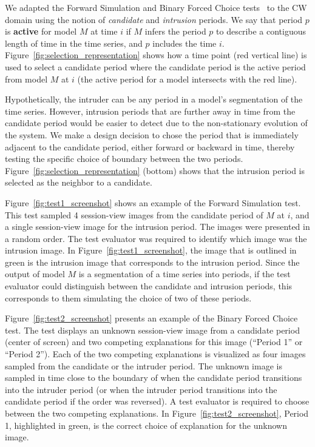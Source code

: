 \documentclass[letterpaper]{article}
\begin{document}
We adapted the Forward Simulation and Binary Forced Choice tests~\cite{doshi2017roadmap} to the CW domain using the notion of \textit{candidate} and \textit{intrusion} periods.
We say that period $p$ is \textbf{active} for model $M$ at time $i$ if  $M$ infers the period $p$ to describe a contiguous length of time in the time series, and $p$ includes the time $i$.
Figure~\ref{fig:selection_representation} shows how a time point (red vertical line) is used to select a candidate period where the candidate period is the active period from model $M$ at $i$ (the active period for a model intersects with the red line).

Hypothetically, the intruder can be any period in a model's segmentation of the time series.
However, intrusion periods that are further away in time from the candidate period would be easier to detect due to the non-stationary evolution of the system.
We make a design decision to chose the period that is immediately adjacent to the candidate period, either forward or backward in time, thereby testing the specific choice of boundary between the two periods.
Figure~\ref{fig:selection_representation} (bottom) shows that the intrusion period is selected as the neighbor to a candidate.


Figure~\ref{fig:test1_screenshot} shows an example of the Forward Simulation test.
This test sampled 4 session-view images from the candidate period of $M$ at $i$, and a single session-view image for the intrusion period.
The images were presented in a random order.
The test evaluator was required to identify which image was the intrusion image.
In Figure~\ref{fig:test1_screenshot}, the image that is outlined in green is the intrusion image that corresponds to the intrusion period.
Since the output of model $M$ is a segmentation of a time series into periods, if the test evaluator could distinguish between the candidate and intrusion periods, this corresponds to them simulating the choice of two of these periods.


Figure~\ref{fig:test2_screenshot} presents an example of the Binary Forced Choice test.
The test displays an unknown session-view image from a candidate period (center of screen) and two competing explanations for this image (``Period 1'' or ``Period 2'').
Each of the  two competing explanations is visualized as four images sampled from the candidate or the intruder period.
The unknown image is sampled in time close to the boundary of when the candidate period transitions into the intruder period (or when the intruder period transitions into the candidate period if the order was reversed).
A test evaluator is required to choose between the two competing explanations.
In Figure~\ref{fig:test2_screenshot}, Period 1, highlighted in green, is the correct choice of explanation for the unknown image.
\end{document}
